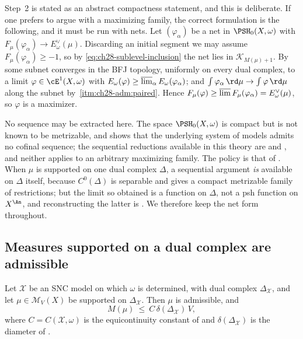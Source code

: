 \begin{remark}
\label{rem:ch28-net-form}
Step~2 is stated as an abstract compactness statement, and this is
deliberate.  If one prefers to argue with a maximizing family, the correct
formulation is the following, and it must be run with nets.  Let
$(\varphi_\alpha)$ be a net in $\PSH_0(X,\omega)$ with
$F_\mu(\varphi_\alpha)\to E^\vee_\omega(\mu)$.  Discarding an initial
segment we may assume $F_\mu(\varphi_\alpha)\geq-1$, so by
\eqref{eq:ch28-sublevel-inclusion} the net lies in
$\mathcal K_{M(\mu)+1}$.  By  some subnet
converges in the BFJ topology, uniformly on every dual complex, to a limit
$\varphi\in\cE^1(X,\omega)$ with
$E_\omega(\varphi)\geq\varlimsup_\alpha E_\omega(\varphi_\alpha)$; and
$\int\varphi_\alpha\,\rd\mu\to\int\varphi\,\rd\mu$ along the subnet by
\,\cref{itm:ch28-adm:paired}.  Hence
$F_\mu(\varphi)\geq\varlimsup F_\mu(\varphi_\alpha)=E^\vee_\omega(\mu)$,
so $\varphi$ is a maximizer.

No sequence may be extracted here.  The space $\PSH_0(X,\omega)$ is
compact but is not known to be metrizable, and
 shows that the underlying system of
models admits no cofinal sequence; the sequential reductions available in
this theory are  and
, and neither applies to an arbitrary
maximizing family.  The policy is that of
.  When $\mu$ is supported on one
dual complex $\Delta$, a sequential argument \emph{is} available on
$\Delta$ itself, because $C^0(\Delta)$ is separable and
 gives a compact metrizable family of
restrictions; but the limit so obtained is a function on $\Delta$, not a
psh function on $X^{\An}$, and reconstructing the latter is
.  We therefore keep the net form
throughout.
\end{remark}

\subsection{Measures supported on a dual complex are admissible}
\label{sec:ch28-skeleton-admissible}

\begin{lemma}
\label{lem:ch28-skeleton-admissible}
Let $\mathcal X$ be an SNC model on which $\omega$ is determined, with
dual complex $\Delta_{\mathcal X}$, and let $\mu\in\mathcal M_V(X)$ be
supported on $\Delta_{\mathcal X}$.  Then $\mu$ is admissible, and
\begin{equation}
\label{eq:ch28-skeleton-M-bound}
 M(\mu)\ \leq\ C\,\delta(\Delta_{\mathcal X})\,V ,
\end{equation}
where $C=C(\mathcal X,\omega)$ is the equicontinuity constant of
 and
$\delta(\Delta_{\mathcal X})$ is the diameter of
.
\end{lemma}

